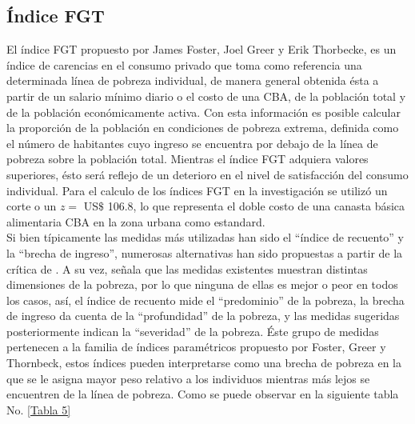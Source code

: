 \newpage

\subsection{Índice FGT}

El índice FGT propuesto por James Foster, Joel Greer y Erik Thorbecke, \cite{navarro2007indice}
es un índice de carencias en el consumo privado que toma como referencia una
determinada línea de pobreza individual, de manera general obtenida ésta a
partir de un salario mínimo diario o el costo de una CBA, de la población total y de la población
económicamente activa. Con esta información es posible calcular la proporción
de la población en condiciones de pobreza extrema, definida como el número de
habitantes cuyo ingreso se encuentra por debajo de la línea de pobreza sobre la
población total. Mientras el índice FGT adquiera valores superiores, ésto será
reflejo de un deterioro en el nivel de satisfacción del consumo individual. Para el calculo de los índices FGT en la investigación se utilizó un corte o un $z=$ US$\$$ 106.8, lo que representa el doble costo de una canasta básica alimentaria CBA en la zona urbana como estandard.\\


Si bien típicamente las medidas más utilizadas han sido el “índice de recuento” y la “brecha de ingreso”, numerosas alternativas han sido propuestas a partir de la crítica de \cite{sen1985well}. A su vez, \cite{Foster} señala que las medidas existentes muestran distintas dimensiones de la pobreza, por lo que ninguna de ellas es mejor o peor en todos los casos, así, el índice de recuento mide el “predominio” de la pobreza, la brecha de ingreso da cuenta de la “profundidad” de la pobreza, y las medidas sugeridas posteriormente indican la “severidad” de la pobreza. Éste grupo de medidas pertenecen a la familia de índices paramétricos propuesto por Foster, Greer y Thornbeck, estos índices pueden interpretarse como una brecha de pobreza en la que se le asigna mayor peso relativo a los individuos mientras más lejos se encuentren de la línea de pobreza. Como se puede observar en la siguiente tabla No. \eqref{Tabla 5}

